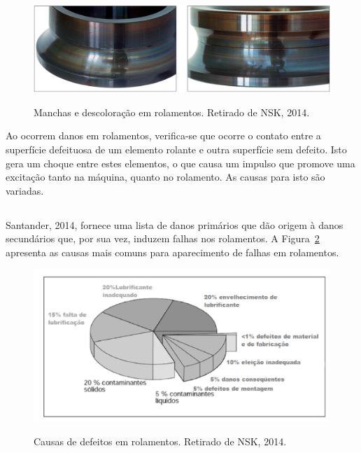 \documentclass[
	12pt,				
	oneside,			
	a4paper,			
	english,			
	brazil,			
	]{abntex2ppgsi}
\begin{document}
\begin{figure}[H]
\centering
\caption {Manchas e descoloração em rolamentos. Retirado de NSK, 2014.}
\includegraphics[width=\textwidth,height=\textheight,keepaspectratio]{manchas_nsk}
\label{manchas_nsk}
\end{figure}

Ao ocorrem danos em rolamentos, verifica-se que ocorre o contato entre a superfície defeituosa de um elemento rolante e outra superfície sem defeito. Isto gera um choque entre estes elementos, o que causa um impulso que promove uma excitação tanto na máquina, quanto no rolamento. As causas para isto são variadas.

\subsection{}

Santander, 2014, fornece uma lista de danos primários que dão origem à danos secundários que, por sua vez, induzem falhas nos rolamentos. A Figura~\ref{falhas_comuns_rolamentos} apresenta as causas mais comuns para aparecimento de falhas em rolamentos. 

\begin{figure}[H]
\centering
\caption {Causas de defeitos em rolamentos. Retirado de NSK, 2014.}
\includegraphics[width=\textwidth,height=\textheight,keepaspectratio]{falhas_comuns_rolamentos}
\label{falhas_comuns_rolamentos}
\end{figure}
\end{document}
